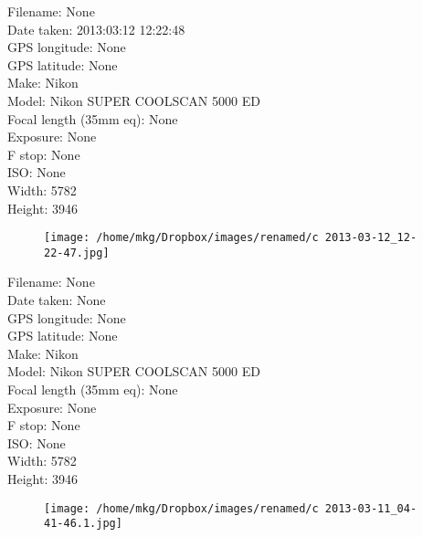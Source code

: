 \clearpage
\recalctypearea
\newpage
\noindent
Filename: None\\ 
Date taken: 2013:03:12 12:22:48\\ 
GPS longitude: None\\ 
GPS latitude: None\\ 
Make: Nikon\\ 
Model: Nikon SUPER COOLSCAN 5000 ED\\ 
Focal length (35mm eq): None\\ 
Exposure: None\\ 
F stop: None\\ 
ISO: None\\ 
Width: 5782\\ 
Height: 3946\\ 

\clearpage
\recalctypearea
\newpage
\noindent
\begin{figure}
    \texttt{[image: /home/mkg/Dropbox/images/renamed/c 2013-03-12\_12-22-47.jpg]}
\end{figure}

\clearpage
\recalctypearea
\newpage
\noindent
Filename: None\\ 
Date taken: None\\ 
GPS longitude: None\\ 
GPS latitude: None\\ 
Make: Nikon\\ 
Model: Nikon SUPER COOLSCAN 5000 ED\\ 
Focal length (35mm eq): None\\ 
Exposure: None\\ 
F stop: None\\ 
ISO: None\\ 
Width: 5782\\ 
Height: 3946\\ 

\clearpage
\recalctypearea
\newpage
\noindent
\begin{figure}
    \texttt{[image: /home/mkg/Dropbox/images/renamed/c 2013-03-11\_04-41-46.1.jpg]}
\end{figure}


